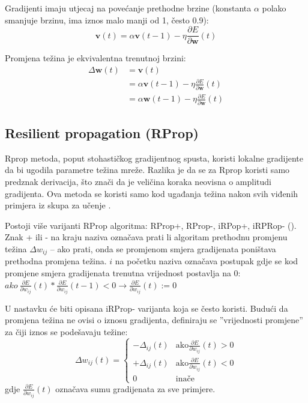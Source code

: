 \documentclass[times, utf8, diplomski, numeric]{fer}
\begin{document}
Gradijenti imaju utjecaj na povećanje prethodne brzine (konstanta $\alpha$ polako smanjuje brzinu, ima iznos malo manji od 1, često 0.9):
\begin{equation}
\boldsymbol{v}(t) = \alpha \boldsymbol{v}(t-1) - \eta \frac{\partial E}{\partial \boldsymbol{w}}(t)
\end{equation}

Promjena težina je ekvivalentna trenutnoj brzini:
\begin{equation}
\begin{split}
	\Delta \boldsymbol{w}(t) &= \boldsymbol{v}(t) \\
		&= \alpha \boldsymbol{v}(t-1) - \eta \frac{\partial E}{\partial \boldsymbol{w}}(t) \\
		&= \alpha \boldsymbol{w}(t-1) - \eta \frac{\partial E}{\partial \boldsymbol{w}}(t)
\end{split}
\end{equation}

\subsection{Resilient propagation (RProp)}

Rprop metoda, poput stohastičkog gradijentnog spusta, koristi lokalne gradijente da bi ugodila parametre težina mreže. Razlika je da se za Rprop koristi samo predznak  derivacija, što znači da je veličina koraka neovisna o amplitudi gradijenta. Ova metoda se koristi samo kod ugađanja težina nakon svih viđenih primjera iz skupa za učenje .

Postoji više varijanti RProp algoritma: RProp+, RProp-, iRPop+, iRPRop- (\cite{Igel00}).
Znak + ili - na kraju naziva označava prati li algoritam prethodnu promjenu težina $\Delta w_{ij}$  -- ako prati, onda se promjenom smjera gradijenata poništava prethodna promjena težina. $i$ na početku naziva označava postupak gdje se kod promjene smjera gradijenata trenutna vrijednost postavlja na 0: $ako \ \frac{\partial E}{\partial w_{ij}}(t) * \frac{\partial E}{\partial w_{ij}}(t-1) < 0 \rightarrow \frac{\partial E}{\partial w_{ij}}(t) := 0$

U nastavku će biti opisana iRProp- varijanta \cite{Igel00} koja se često koristi. Budući da promjena težina ne ovisi o iznosu gradijenta, definiraju se ''vrijednosti promjene'' za čiji iznos se podešavaju težine:
\begin{equation}
  \Delta w_{ij}(t) =
    \left\{
	    \begin{array}{ll}
		    -\Delta_{ij}(t)  & \mbox{ako} \frac{\partial E}{\partial w_{ij}}(t) > 0 \\
		    +\Delta_{ij}(t)  & \mbox{ako} \frac{\partial E}{\partial w_{ij}}(t) < 0\\
		    0  & \mbox{inače}
	    \end{array}
    \right.
\end{equation}
gdje $\frac{\partial E}{\partial w_{ij}}(t)$ označava sumu gradijenata za sve primjere.
\end{document}

